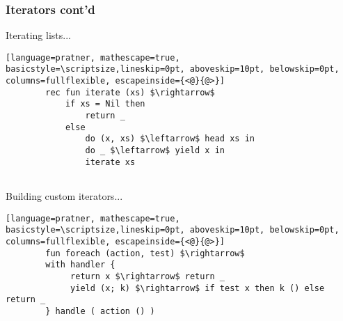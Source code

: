 \documentclass[t]{beamer}
\begin{document}
\begin{frame}[fragile]
	\frametitle{Iterators cont'd}
	
	Iterating lists...
	
	\begin{lstlisting}[language=pratner, mathescape=true, basicstyle=\scriptsize,lineskip=0pt, aboveskip=10pt, belowskip=0pt, columns=fullflexible, escapeinside={<@}{@>}]
		rec fun iterate (xs) $\rightarrow$ 
			if xs = Nil then 
				return _ 
			else
				do (x, xs) $\leftarrow$ head xs in
				do _ $\leftarrow$ yield x in
				iterate xs
		
	\end{lstlisting}  
	
	Building custom iterators...
	
	\begin{lstlisting}[language=pratner, mathescape=true, basicstyle=\scriptsize,lineskip=0pt, aboveskip=10pt, belowskip=0pt, columns=fullflexible, escapeinside={<@}{@>}]
		fun foreach (action, test) $\rightarrow$ 
		with handler {
			 return x $\rightarrow$ return _
			 yield (x; k) $\rightarrow$ if test x then k () else return _
		} handle ( action () )
	\end{lstlisting}  
\end{frame}
\end{document}
